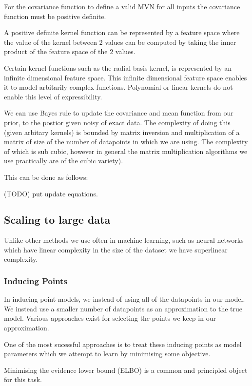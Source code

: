 \documentclass[12pt, a4paper]{report}
\theoremstyle{definition}
\begin{document}
For the covariance function to define a valid MVN for all inputs the covariance function must be positive definite.

A positive definite kernel function can be represented by a feature space where the value of the kernel between 2 values can be computed by taking the inner product of the feature space of the 2 values.

Certain kernel functions such as the radial basis kernel, is represented by an infinite dimensional feature space. This infinite dimensional feature space enables it to model arbitarily complex functions. Polynomial or linear kernels do not enable this level of expressibility.

We can use Bayes rule to update the covariance and mean function from our prior, to the postior given noisy of exact data. The complexity of doing this (given arbitary kernels) is bounded by matrix inversion and  multiplication of a matrix of size of the number of datapoints in which we are using. The complexity of which is sub cubic, however in general the matrix multiplication algorithms we use practically are of the cubic variety).

This can be done as follows: 

(TODO) put update equations.

\subsection{Scaling to large data}

Unlike other methods we use often in machine learning, such as neural networks which have linear complexity in the size of the dataset we have superlinear complexity.

\subsubsection{Inducing Points}

In inducing point models, we instead of using all of the datapoints in our model. We instead use a smaller number of datapoints as an approximation to the true model. Various approaches exist for selecting the points we keep in our approximation.

One of the most sucessful approaches is to treat these inducing points as model parameters which we attempt to learn by minimising some objective.

Minimising the evidence lower bound (ELBO) is a common and principled object for this task.
\end{document}

